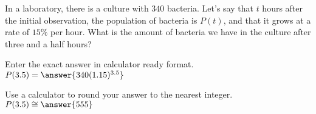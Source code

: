 \documentclass{ximera}
\author{Ivo Terek}
\begin{document}
\begin{exercise}

In a laboratory, there is a culture with $340$ bacteria. Let's say that $t$ hours after the initial observation, the population of bacteria is $P(t)$, and that it grows at a rate of $15\%$ per hour. What is the amount of bacteria we have in the culture after three and a half hours? 

Enter the exact answer in calculator ready format.  $P(3.5)=\answer{340(1.15)^{3.5}}$

Use a calculator to round your answer to the nearest integer. $P(3.5)\cong \answer{555}$ \calcHW

\end{exercise}
\end{document}
